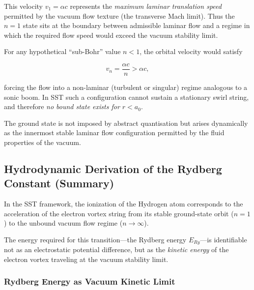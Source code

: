 \documentclass[10pt,reprint,aps,onecolumn,nofootinbib]{revtex4-2}
\begin{document}
        This velocity $v_1 = \alpha c$ represents the \emph{maximum laminar
translation speed} permitted by the vacuum flow texture (the transverse
        Mach limit). Thus the $n=1$ state sits at the boundary between
        admissible laminar flow and a regime in which the required flow speed
        would exceed the vacuum stability limit.

        For any hypothetical ``sub-Bohr'' value $n<1$, the orbital velocity
        would satisfy

        \begin{equation}
            v_n = \frac{\alpha c}{n} > \alpha c,
        \end{equation}

        forcing the flow into a non-laminar (turbulent or singular) regime
        analogous to a sonic boom. In SST such a configuration cannot sustain
        a stationary swirl string, and therefore \emph{no bound state exists
for $r < a_0$}.

        The ground state is not imposed by abstract quantisation but arises
        dynamically as the innermost stable laminar flow configuration permitted
        by the fluid properties of the vacuum.
\subsection{Hydrodynamic Derivation of the Rydberg Constant (Summary)}
    \label{sec:SST_rydberg}

    In the SST framework, the ionization of the Hydrogen atom corresponds to
    the acceleration of the electron vortex string from its stable ground-state
    orbit ($n=1$) to the unbound vacuum flow regime ($n \to \infty$).

    The energy required for this transition—the Rydberg energy $E_{Ry}$—is
    identifiable not as an electrostatic potential difference, but as the
    \emph{kinetic energy} of the electron vortex traveling at the vacuum
    stability limit.

    \subsubsection*{Rydberg Energy as Vacuum Kinetic Limit}
\end{document}
